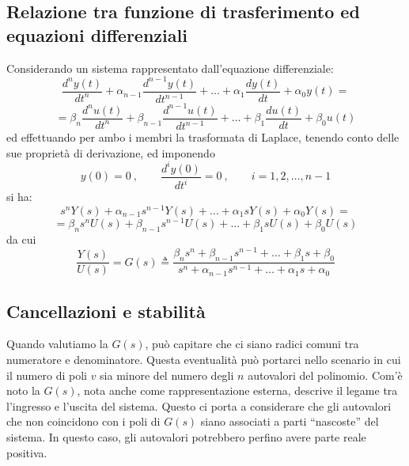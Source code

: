 \documentclass[a4paper]{report}
\begin{document}
\subsection{Relazione tra funzione di trasferimento ed equazioni
  differenziali} 
Considerando un sistema rappresentato dall'equazione differenziale:
\begin{displaymath}
  \frac{d^n y(t)}{dt^n}+\alpha_{n-1}\frac{d^{n-1} y(t)}{dt^{n-1}} +
  \ldots+\alpha_{1}\frac{dy(t)}{dt} + \alpha_0y(t)=
\end{displaymath}\label{eq:gendiffsys}
\begin{equation}
  =\beta_n\frac{d^n u(t)}{dt^n} + \beta_{n-1}\frac{d^{n-1}
    u(t)}{dt^{n-1}} + \ldots+\beta_{1}\frac{du(t)}{dt}+\beta_0u(t)
\end{equation}
ed effettuando per ambo i membri la trasformata di Laplace, tenendo
conto delle sue propriet\`a di derivazione, ed imponendo 
\begin{displaymath}
  y(0)=0 ~, \qquad \frac{d^iy(0)}{dt^i}=0 ~, \qquad i=1,2,\ldots,n-1
\end{displaymath}
si ha:
\begin{displaymath}
  s^nY(s)+\alpha_{n-1}s^{n-1}Y(s)+\ldots+\alpha_1sY(s)+\alpha_0Y(s)=
\end{displaymath}
\begin{equation}\label{eq:lapgendiffsys}
  = \beta_n s^nU(s)+\beta_{n-1}s^{n-1}U(s)+\ldots+\beta_1sU(s)+\beta_0U(s)
\end{equation}
da cui
\begin{equation}\label{eq:secgenfdt}
  \frac{Y(s)}{U(s)}=G(s)\triangleq \frac{\beta_n
    s^n+\beta_{n-1}s^{n-1} +
    \ldots+\beta_1s+\beta_0}{s^n+\alpha_{n-1}s^{n-1} + \ldots+\alpha_1s+\alpha_0}
\end{equation}

\subsection{Cancellazioni e stabilit\`a}
Quando valutiamo la $G(s)$, pu\`o capitare che ci siano radici comuni
tra numeratore e denominatore. Questa eventualit\`a pu\`o portarci nello
scenario in cui il numero di poli $v$ sia minore del numero degli $n$
autovalori del polinomio. Com'\`e noto la $G(s)$, nota anche come
rappresentazione esterna, descrive il legame tra l'ingresso e l'uscita
del sistema. Questo ci porta a considerare che gli autovalori che non
coincidono con i poli di $G(s)$ siano associati a parti ``nascoste''
del sistema. In questo caso, gli autovalori potrebbero perfino avere
parte reale positiva.
\end{document}
